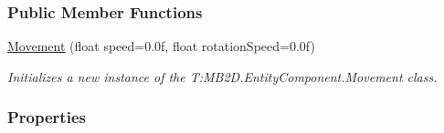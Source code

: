 \subsubsection*{Public Member Functions}
\begin{DoxyCompactItemize}
\item 
\hyperlink{class_m_b2_d_1_1_entity_component_1_1_movement_a12d8169b44077ab8683db91208d81542}{Movement} (float speed=0.\+0f, float rotation\+Speed=0.\+0f)
\begin{DoxyCompactList}\small\item\em Initializes a new instance of the T\+:\+M\+B2\+D.\+Entity\+Component.\+Movement class. \end{DoxyCompactList}\end{DoxyCompactItemize}
\subsubsection*{Properties}
